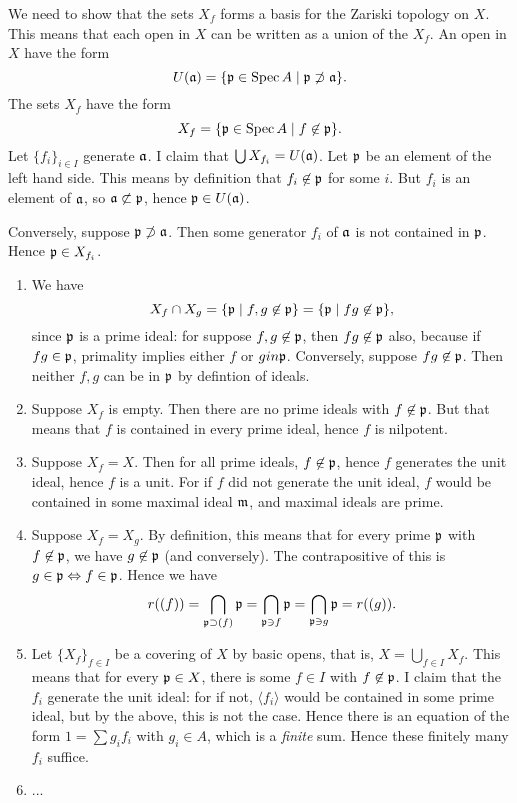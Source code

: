 \documentclass[11pt, english]{article}
\begin{document}
\begin{sol}
We need to show that the sets $X_f$ forms a basis for the Zariski topology on $X$. This means that each open in $X$ can be written as a union of the $X_f$. An open in $X$ have the form 
\[
U(\mathfrak{a}) = \{ \mathfrak{p} \in \operatorname{Spec} A \mid \mathfrak{p} \not \supset \mathfrak{a} \}.
\]
The sets $X_f$ have the form
\[
X_f = \{ \mathfrak{p} \in \operatorname{Spec} A \mid f \not \in \mathfrak{p} \}.
\]
Let $\{ f_i \}_{i \in I}$ generate $\mathfrak{a}$. I claim that $\bigcup X_{f_i} = U(\mathfrak{a})$. Let $\mathfrak{p}$ be an element of the left hand side. This means by definition that $f_i \not \in \mathfrak{p}$ for some $i$. But $f_i$ is an element of $\mathfrak{a}$, so $\mathfrak{a} \not \subset \mathfrak{p}$, hence $\mathfrak{p} \in U(\mathfrak{a})$. 

Conversely, suppose $\mathfrak{p} \not \supset \mathfrak{a}$. Then some generator $f_i$ of $\mathfrak{a}$ is not contained in $\mathfrak{p}$. Hence $\mathfrak{p} \in X_{f_i}$. 

\begin{enumerate}
\item We have $$X_f \cap X_g = \{ \mathfrak{p} \mid f,g  \not \in \mathfrak{p} \} = \{ \mathfrak{p} \mid fg \not \in \mathfrak{p} \} ,$$
since $\mathfrak{p}$ is a prime ideal: for suppose $f,g \not \in \mathfrak{p}$, then $fg \not \in \mathfrak{p}$ also, because if $fg \in \mathfrak{p}$, primality implies either $f$ or $g in \mathfrak{p}$. Conversely, suppose $fg \not \in \mathfrak{p}$. Then neither $f,g$ can be in $\mathfrak{p}$ by defintion of ideals.
\item Suppose $X_f$ is empty. Then there are no prime ideals with $f \not \in \mathfrak{p}$. But that means that $f$ is contained in every prime ideal, hence $f$ is nilpotent.
\item Suppose $X_f = X$. Then for all prime ideals, $f \not \in \mathfrak{p}$, hence $f$ generates the unit ideal, hence $f$ is a unit. For if $f$ did not generate the unit ideal, $f$ would be contained in some maximal ideal $\mathfrak{m}$, and maximal ideals are prime.
\item Suppose $X_f=X_g$. By definition, this means that for every prime $\mathfrak{p}$ with $f \not \in \mathfrak{p}$, we have $g \not \in \mathfrak{p}$ (and conversely). The contrapositive of this is $g \in \mathfrak{p} \Leftrightarrow f \in \mathfrak{p}$. Hence we have 
$$r((f)) = \bigcap_{\mathfrak{p} \supset (f)} \mathfrak{p}=\bigcap_{\mathfrak{p} \ni f} \mathfrak{p} = \bigcap_{\mathfrak{p} \ni g} \mathfrak{p} = r((g)).$$ 
\item Let $\{X_f\}_{f \in I}$ be a covering of $X$ by basic opens, that is, $X= \bigcup_{f \in I} X_f$. This means that for every $\mathfrak{p} \in X$, there is some $f \in I$ with $f \not \in \mathfrak{p}$. I claim that the $f_i$ generate the unit ideal: for if not, $\langle f_i \rangle$ would be contained in some prime ideal, but by the above, this is not the case. Hence there is an equation of the form $1=\sum g_if_i$ with $g_i \in A$, which is a \emph{finite} sum. Hence these finitely many $f_i$ suffice.
\item ...
\end{enumerate}
\end{sol}
\end{document}
